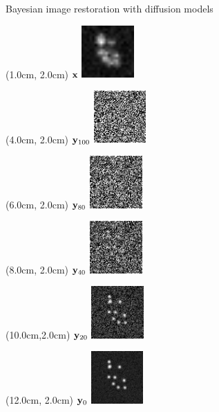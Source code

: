 \documentclass{beamer}					%
\begin{document}
\begin{frame}{Bayesian image restoration with diffusion models}

\begin{textblock*}{2cm}(1.0cm, 2.0cm)
$\bold{x}$
\includegraphics[width=2cm]{media/diffusion_example/Diffusion_lr-0.png}
\end{textblock*}
\begin{textblock*}{2cm}(4.0cm, 2.0cm)
$\bold{y}_{100}$
\includegraphics[width=2cm]{media/diffusion_example/0_1_sr_1.png}
\end{textblock*}
\begin{textblock*}{2cm}(6.0cm, 2.0cm)
$\bold{y}_{80}$
\includegraphics[width=2cm]{media/diffusion_example/0_1_sr_19.png}
\end{textblock*}
\begin{textblock*}{2cm}(8.0cm, 2.0cm)
$\bold{y}_{40}$
\includegraphics[width=2cm]{media/diffusion_example/0_1_sr_39.png}
\end{textblock*}
\begin{textblock*}{2cm}(10.0cm,2.0cm)
$\bold{y}_{20}$
\includegraphics[width=2cm]{media/diffusion_example/0_1_sr_79.png}
\end{textblock*}
\begin{textblock*}{2cm}(12.0cm, 2.0cm)
$\bold{y}_{0}$
\includegraphics[width=2cm]{media/diffusion_example/0_1_sr_99.png}
\end{textblock*}


\end{frame}
\end{document}
